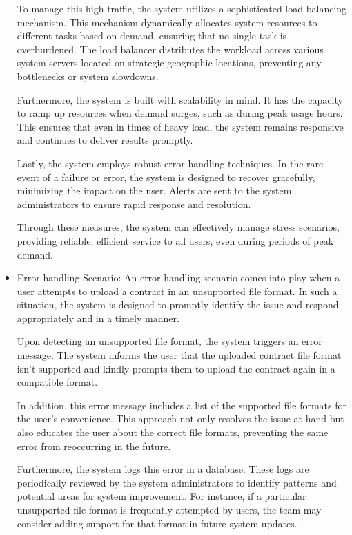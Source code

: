 \begin{itemize}
To manage this high traffic, the system utilizes a sophisticated load balancing mechanism. This mechanism dynamically allocates system resources to different tasks based on demand, ensuring that no single task is overburdened. The load balancer distributes the workload across various system servers located on strategic geographic locations, preventing any bottlenecks or system slowdowns.

Furthermore, the system is built with scalability in mind. It has the capacity to ramp up resources when demand surges, such as during peak usage hours. This ensures that even in times of heavy load, the system remains responsive and continues to deliver results promptly.

Lastly, the system employs robust error handling techniques. In the rare event of a failure or error, the system is designed to recover gracefully, minimizing the impact on the user. Alerts are sent to the system administrators to ensure rapid response and resolution.

Through these measures, the system can effectively manage stress scenarios, providing reliable, efficient service to all users, even during periods of peak demand.

    \item Error handling Scenario: An error handling scenario comes into play when a user attempts to upload a contract in an unsupported file format. In such a situation, the system is designed to promptly identify the issue and respond appropriately and in a timely manner.

Upon detecting an unsupported file format, the system triggers an error message. The system informs the user that the uploaded contract file format isn't supported and kindly prompts them to upload the contract again in a compatible format.

In addition, this error message includes a list of the supported file formats for the user's convenience. This  approach not only resolves the issue at hand but also educates the user about the correct file formats, preventing the same error from reoccurring in the future.

Furthermore, the system logs this error in a database. These logs are periodically reviewed by the system administrators to identify patterns and potential areas for system improvement. For instance, if a particular unsupported file format is frequently attempted by users, the team may consider adding support for that format in future system updates.


\end{itemize}

